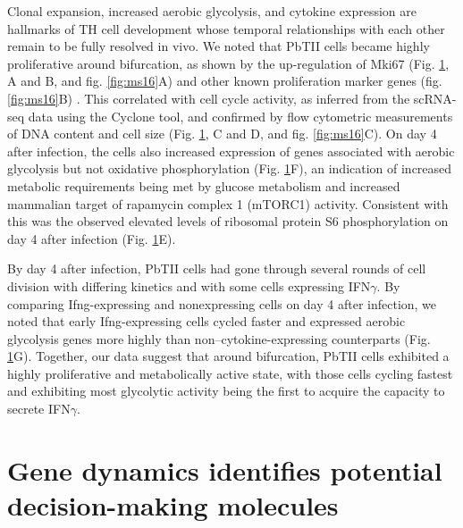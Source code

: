 \begin{figure}
    \label{fig:proliferation}
\end{figure}

Clonal expansion, increased aerobic glycolysis, and cytokine expression are hallmarks of TH cell development whose temporal relationships with each other remain to be fully resolved in vivo. We noted that PbTII cells became highly proliferative around bifurcation, as shown by the up-regulation of Mki67 (Fig. \ref{fig:proliferation}, A and B, and fig. \ref{fig:ms16}A) and other known proliferation marker genes (fig. \ref{fig:ms16}B) \cite{Whitfield2006-jv}. This correlated with cell cycle activity, as inferred from the scRNA-seq data using the Cyclone tool, and confirmed by flow cytometric measurements of DNA content and cell size (Fig. \ref{fig:proliferation}, C and D, and fig. \ref{fig:ms16}C). On day 4 after infection, the cells also increased expression of genes associated with aerobic glycolysis but not oxidative phosphorylation (Fig. \ref{fig:proliferation}F), an indication of increased metabolic requirements being met by glucose metabolism and increased mammalian target of rapamycin complex 1 (mTORC1) activity. Consistent with this was the observed elevated levels of ribosomal protein S6 phosphorylation on day 4 after infection (Fig. \ref{fig:proliferation}E).

By day 4 after infection, PbTII cells had gone through several rounds of cell division with differing kinetics and with some cells expressing IFN\( \gamma \). By comparing Ifng-expressing and nonexpressing cells on day 4 after infection, we noted that early Ifng-expressing cells cycled faster and expressed aerobic glycolysis genes more highly than non–cytokine-expressing counterparts (Fig. \ref{fig:proliferation}G). Together, our data suggest that around bifurcation, PbTII cells exhibited a highly proliferative and metabolically active state, with those cells cycling fastest and exhibiting most glycolytic activity being the first to acquire the capacity to secrete IFN\( \gamma \).

\section{Gene dynamics identifies potential decision-making molecules}

